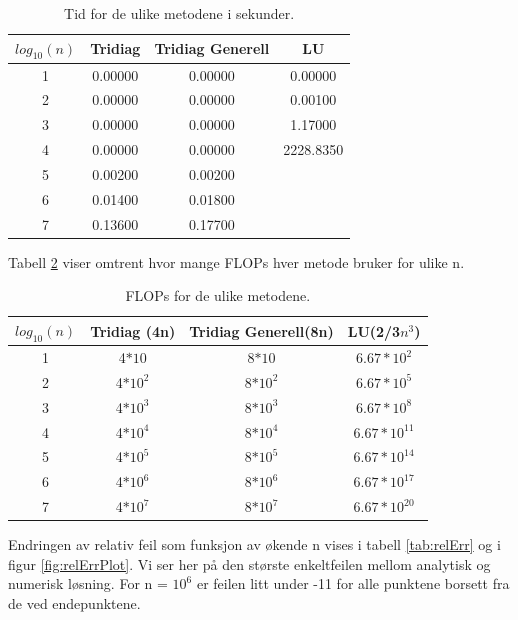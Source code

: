 \documentclass[reprint,english,notitlepage]{revtex4-1}
\begin{document}
	\begin{table}[H]
		\begin{center}
			\caption{Tid for de ulike metodene i sekunder.}
			\label{tab:tid}
			\begin{tabular}{|c|c|c|c|} \hline
				\textbf{$log_{10}(n)$} & \textbf{Tridiag} & \textbf{Tridiag Generell} & \textbf{LU} \\ \hline
				1 & 0.00000 & 0.00000 & 0.00000 \\
				2 & 0.00000 & 0.00000 & 0.00100 \\
				3 & 0.00000 & 0.00000 & 1.17000 \\
				4 & 0.00000 & 0.00000 & 2228.8350 \\
				5 & 0.00200 & 0.00200 & \\
				6 & 0.01400 & 0.01800 & \\
				7 & 0.13600 & 0.17700 & \\ \hline
			\end{tabular}
		\end{center}
	\end{table}
	Tabell \ref{tab:flops} viser omtrent hvor mange FLOPs hver metode bruker for ulike n.
	\begin{table}[H]
		\begin{center}
			\caption{FLOPs for de ulike metodene.}
			\label{tab:flops}
			\begin{tabular}{|c|c|c|c|} \hline
				\textbf{$log_{10}(n)$} & \textbf{Tridiag (4n)} & \textbf{Tridiag Generell(8n)} & \textbf{LU(2/3$n^3$)} \\ \hline
				1 & 4$*10$ & 8$*10$ & $6.67*10^{2}$ \\
				2 & 4$*10^2$ & 8$*10^{2}$ & $6.67*10^{5}$ \\
				3 & 4$*10^3$ & 8$*10^{3}$ & $6.67*10^{8}$ \\
				4 & 4$*10^4$ & 8$*10^{4}$ & $6.67*10^{11}$ \\
				5 & 4$*10^5$ & 8$*10^{5}$ & $6.67*10^{14}$\\
				6 & 4$*10^6$ & 8$*10^{6}$ & $6.67*10^{17}$\\
				7 & 4$*10^7$ & 8$*10^{7}$ & $6.67*10^{20}$\\ \hline
			\end{tabular}
		\end{center}
	\end{table}

	Endringen av relativ feil som funksjon av økende n vises i tabell \ref{tab:relErr} og i figur \ref{fig:relErrPlot}. Vi ser her på den største enkeltfeilen mellom analytisk og numerisk løsning. For n = $10^6$ er feilen litt under -11 for alle punktene borsett fra de ved endepunktene.
	
\end{document}
